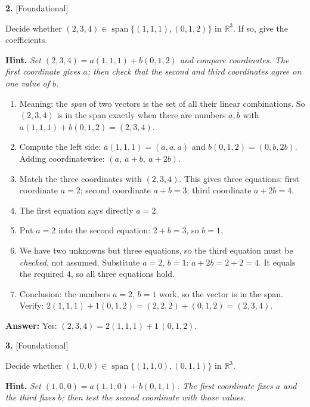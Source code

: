 \documentclass[11pt]{article}
\begin{document}
\par\vspace{2pt}
\begin{minipage}{\linewidth}\textbf{2.} \hfill{\scriptsize\color{ink}[Foundational]}\par\nopagebreak Decide whether $(2,3,4)\in\operatorname{span}\{(1,1,1),(0,1,2)\}$ in $\mathbb{R}^{3}$. If so, give the coefficients.
\par\smallskip\begingroup\small\color{ink}\textbf{Hint.} \textit{Set $(2,3,4)=a(1,1,1)+b(0,1,2)$ and compare coordinates. The first coordinate gives $a$; then check that the second and third coordinates agree on one value of $b$.}\endgroup
\end{minipage}\par\nopagebreak
\begin{tcolorbox}[breakable,colback=ans,colframe=ansb,boxrule=0.5pt,left=4pt,right=4pt,top=2pt,bottom=2pt]\begin{enumerate}[leftmargin=2.2em,itemsep=1pt,topsep=1pt,label=\textbf{Step \arabic*.}]\item Meaning: the \emph{span} of two vectors is the set of all their linear combinations. So $(2,3,4)$ is in the span exactly when there are numbers $a,b$ with $a(1,1,1)+b(0,1,2)=(2,3,4)$.
\item Compute the left side: $a(1,1,1)=(a,a,a)$ and $b(0,1,2)=(0,b,2b)$. Adding coordinatewise: $(a,\ a+b,\ a+2b)$.
\item Match the three coordinates with $(2,3,4)$. This gives three equations: first coordinate $a=2$; second coordinate $a+b=3$; third coordinate $a+2b=4$.
\item The first equation says directly $a=2$.
\item Put $a=2$ into the second equation: $2+b=3$, so $b=1$.
\item We have two unknowns but three equations, so the third equation must be \emph{checked}, not assumed. Substitute $a=2$, $b=1$: $a+2b=2+2=4$. It equals the required $4$, so all three equations hold.
\item Conclusion: the numbers $a=2$, $b=1$ work, so the vector is in the span. Verify: $2(1,1,1)+1(0,1,2)=(2,2,2)+(0,1,2)=(2,3,4)$.
\end{enumerate}\textbf{Answer:} Yes: $(2,3,4)=2(1,1,1)+1\,(0,1,2)$.\end{tcolorbox}
\par\vspace{2pt}
\begin{minipage}{\linewidth}\textbf{3.} \hfill{\scriptsize\color{ink}[Foundational]}\par\nopagebreak Decide whether $(1,0,0)\in\operatorname{span}\{(1,1,0),(0,1,1)\}$ in $\mathbb{R}^{3}$.
\par\smallskip\begingroup\small\color{ink}\textbf{Hint.} \textit{Set $(1,0,0)=a(1,1,0)+b(0,1,1)$. The first coordinate fixes $a$ and the third fixes $b$; then test the second coordinate with those values.}\endgroup
\end{minipage}\par\nopagebreak
\end{document}
